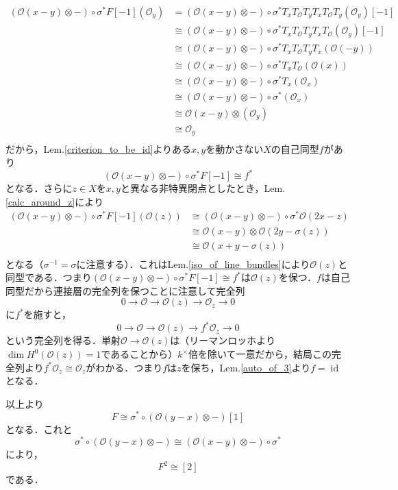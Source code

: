 \documentclass[uplatex,a4paper,11pt]{jsarticle}
\makeatletter
\theoremstyle{mystyle} %
\renewenvironment{proof}[1][\proofname]{\par
 \pushQED{\qed}%
 \normalfont \topsep6\p@\@plus6\p@\relax
 \trivlist
 \item[\hskip\labelsep
 \itshape
 {\bf\underline{#1}}]\ignorespaces
}{%
 \popQED\endtrivlist\@endpefalse
}
\DeclareMathOperator{\id}{id}
\makeatother
\begin{document}
\begin{proof}
	\begin{align}
		(\mathcal{O}(x - y)\otimes - )\circ\sigma^* F[ - 1](\mathcal{O}_y)
		 & = (\mathcal{O}(x - y)\otimes - )\circ\sigma^*T_xT_\mathcal{O}T_yT_xT_\mathcal{O}T_y(\mathcal{O}_y)[ - 1]  \\
		 & \cong (\mathcal{O}(x - y)\otimes - )\circ\sigma^*T_xT_\mathcal{O}T_yT_xT_\mathcal{O}(\mathcal{O}_y)[ - 1] \\
		 & \cong (\mathcal{O}(x - y)\otimes - )\circ\sigma^*T_xT_\mathcal{O}T_yT_x(\mathcal{O}( - y))                \\
		 & \cong (\mathcal{O}(x - y)\otimes - )\circ\sigma^*T_xT_\mathcal{O}(\mathcal{O}(x))                         \\
		 & \cong (\mathcal{O}(x - y)\otimes - )\circ\sigma^*T_x(\mathcal{O}_x)                                       \\
		 & \cong (\mathcal{O}(x - y)\otimes - )\circ\sigma^*(\mathcal{O}_x)                                          \\
		 & \cong \mathcal{O}(x - y)\otimes(\mathcal{O}_y)                                                            \\
		 & \cong \mathcal{O}_y                                                                                       \\
	\end{align}
	だから，Lem.\ref{criterion_to_be_id}よりある$x,y$を動かさない$X$の自己同型$f$があり$$(\mathcal{O}(x - y)\otimes - )\circ\sigma^* F[ - 1] \cong f^*$$となる．さらに$z \in X$を$x,y$と異なる非特異閉点としたとき，Lem.\ref{calc_around_z}により
	\begin{align}
		(\mathcal{O}(x - y)\otimes - )\circ\sigma^* F[ - 1](\mathcal{O}(z))
		 & \cong (\mathcal{O}(x - y)\otimes - )\circ\sigma^* \mathcal{O}(2x - z) \\
		 & \cong \mathcal{O}(x - y)\otimes \mathcal{O}(2y - \sigma(z))           \\
		 & \cong \mathcal{O}(x + y - \sigma(z))                                  \\
	\end{align}
	となる（$\sigma^{ - 1}=\sigma$に注意する）．これはLem.\ref{iso_of_line_bundles}により$\mathcal{O}(z)$と同型である．つまり$(\mathcal{O}(x - y)\otimes - )\circ\sigma^* F[ - 1] \cong f^*$は$\mathcal{O}(z)$を保つ．$f$は自己同型だから連接層の完全列を保つことに注意して完全列$$0 \to \mathcal{O} \to \mathcal{O}(z)\to\mathcal{O}_z\to 0$$に$f^*$を施すと，$$0 \to \mathcal{O} \to \mathcal{O}(z)\to f^*\mathcal{O}_z\to 0$$という完全列を得る．単射$\mathcal{O} \to \mathcal{O}(z)$は（リーマンロッホより$\dim H^0(\mathcal{O}(z))=1$であることから）$k^\times$倍を除いて一意だから，結局この完全列より$f^*\mathcal{O}_z \cong \mathcal{O}_z$がわかる．つまり$f$は$z$を保ち，Lem.\ref{auto_of_3}より$f = \id$となる．

	以上より$$F \cong \sigma^*\circ (\mathcal{O}(y - x)\otimes - )[1]$$となる．これと$$\sigma^*\circ (\mathcal{O}(y - x)\otimes - ) \cong (\mathcal{O}(x - y)\otimes - )\circ \sigma^*$$により，$$F^2 \cong [2]$$である．
\end{proof}
\end{document}
